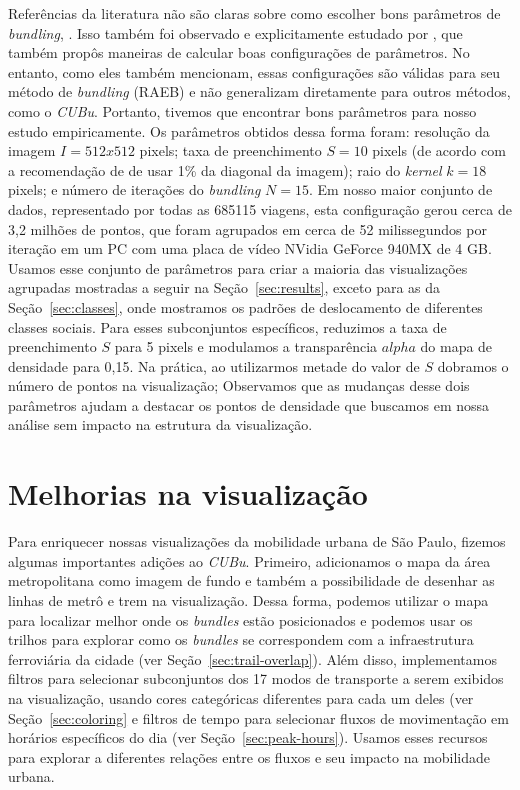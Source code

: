 Referências da literatura não são claras sobre como escolher bons parâmetros de
\emph{bundling}, \citet{Lhuillier2017}. Isso também foi observado e explicitamente
estudado por \citet{zeng:19}, que também propôs maneiras de calcular boas
configurações de parâmetros. No entanto, como eles também mencionam, essas
configurações são válidas para seu método de \emph{bundling} (RAEB) e não
generalizam diretamente para outros métodos, como o \emph{CUBu}. Portanto,
tivemos que encontrar bons parâmetros para nosso estudo empiricamente. Os
parâmetros obtidos dessa forma foram: resolução da imagem $I = 512 x 512$
pixels; taxa de preenchimento $S = 10$ pixels (de acordo com a recomendação de
\cite{zwan:16} de usar 1\% da diagonal da imagem); raio do \emph{kernel} $k = 18$
pixels; e número de iterações do \emph{bundling} $N = 15$. Em nosso maior
conjunto de dados, representado por todas as \num{685115} viagens, esta
configuração gerou cerca de 3,2 milhões de pontos, que foram agrupados em cerca
de 52 milissegundos por iteração em um PC com uma placa de vídeo NVidia GeForce
940MX de 4 GB. Usamos esse conjunto de parâmetros para criar a maioria das
visualizações agrupadas mostradas a seguir na Seção~\ref{sec:results}, exceto para as da Seção~\ref{sec:classes},
onde mostramos os padrões de deslocamento de diferentes classes sociais.
Para esses subconjuntos específicos, reduzimos a taxa de preenchimento $S$ para
5 pixels e modulamos a transparência $alpha$ do mapa de densidade para 0,15. Na
prática, ao utilizarmos metade do valor de $S$ dobramos o número de pontos na
visualização;  Observamos que as mudanças desse dois parâmetros ajudam a
destacar os pontos de densidade que buscamos em nossa análise sem impacto na
estrutura da visualização.


\section{Melhorias na visualização}

Para enriquecer nossas visualizações da mobilidade urbana de São Paulo, fizemos
algumas importantes adições ao \emph{CUBu}. Primeiro, adicionamos o mapa da área
metropolitana como imagem de fundo e também a possibilidade de desenhar as
linhas de metrô e trem na visualização. Dessa forma, podemos utilizar o mapa
para localizar melhor onde os \emph{bundles} estão posicionados e podemos usar
os trilhos para explorar como os \emph{bundles} se correspondem com a
infraestrutura ferroviária da cidade (ver Seção~\ref{sec:trail-overlap}). Além
disso, implementamos filtros para selecionar subconjuntos dos 17 modos de
transporte a serem exibidos na visualização, usando cores categóricas diferentes
para cada um deles (ver Seção~\ref{sec:coloring} e filtros de tempo para selecionar fluxos de movimentação em
horários específicos do dia (ver Seção~\ref{sec:peak-hours}). Usamos esses recursos para explorar a diferentes
relações entre os fluxos e seu impacto na mobilidade urbana.
